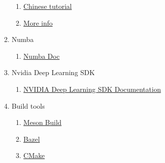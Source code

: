 \documentclass[12pt, a4paper]{article}
\begin{document}
\begin{enumerate}
\begin{enumerate}
      \item \href{https://www.liaoxuefeng.com/}{Chinese tutorial}
      \item \href{https://git-scm.com/}{More info}
    \end{enumerate}
  \item Numba
    \begin{enumerate}
      \item \href{https://numba.pydata.org/}{Numba Doc}
    \end{enumerate}
  \item Nvidia Deep Learning SDK
    \begin{enumerate}
      \item \href{http://docs.nvidia.com/deeplearning/sdk/index.html}{NVIDIA Deep Learning SDK Documentation}
    \end{enumerate}
  \item Build tools
    \begin{enumerate}
      \item \href{http://mesonbuild.com/}{Meson Build}
      \item \href{https://www.bazel.build/}{Bazel}
      \item \href{https://cmake.org/}{CMake}
    \end{enumerate}
\end{enumerate}
\end{document}
